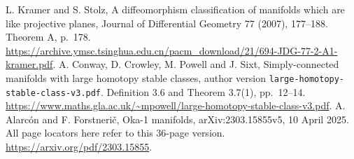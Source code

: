 L. Kramer and S. Stolz, A diffeomorphism classification of manifolds which are like projective planes, Journal of Differential Geometry 77 (2007), 177--188. Theorem A, p.~178. \url{https://archive.ymsc.tsinghua.edu.cn/pacm_download/21/694-JDG-77-2-A1-kramer.pdf}.
A. Conway, D. Crowley, M. Powell and J. Sixt, Simply-connected manifolds with large homotopy stable classes, author version \nolinkurl{large-homotopy-stable-class-v3.pdf}. Definition 3.6 and Theorem 3.7(1), pp.~12--14. \url{https://www.maths.gla.ac.uk/~mpowell/large-homotopy-stable-class-v3.pdf}.
A. Alarc\'on and F. Forstneri\v c, Oka-1 manifolds, arXiv:2303.15855v5, 10 April 2025. All page locators here refer to this 36-page version. \url{https://arxiv.org/pdf/2303.15855}.
